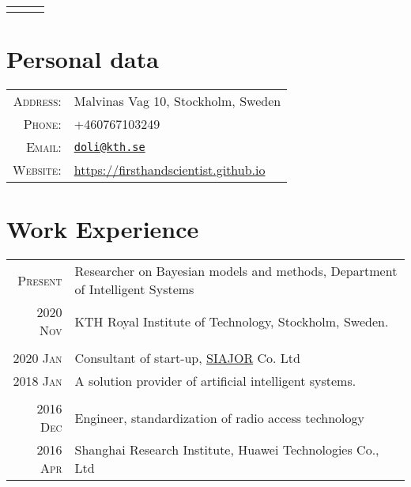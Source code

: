 \documentclass[a4paper,10pt]{article}
\begin{document}
\pagestyle{empty}


\begin{center}
  \begin{tabular}{lcr}
    \par{\centering{\Huge Dong Liu}\bigskip\par} & & %
  \end{tabular}
\end{center}

\section{Personal data}

\begin{tabular}{rl}
  \textsc{Address:} & Malvinas Vag 10, Stockholm, Sweden \\
  \textsc{Phone:} & +460767103249 \\
  \textsc{Email:} & \href{mailto:doli@kth.se}{\nolinkurl{doli@kth.se}} \\
  \textsc{Website:} & \href{https://firsthandscientist.github.io}{https://firsthandscientist.github.io}\\
\end{tabular}


\section{Work Experience}
\begin{tabular}{r|p{13cm}}
  \textsc{Present}  & Researcher on Bayesian models and methods, Department of Intelligent Systems \\
  \textsc{2020 Nov}  & KTH Royal Institute of Technology, Stockholm, Sweden.\\
  \multicolumn{2}{c}{} \\

  \textsc{2020 Jan}  & Consultant of start-up, \href{http://www.siajor.com/}{SIAJOR} Co. Ltd \\
  \textsc{2018 Jan}  & A solution provider of artificial intelligent systems. \\
  \multicolumn{2}{c}{} \\

  \textsc{2016 Dec}  & Engineer, standardization of radio access technology  \\
  \textsc{2016 Apr}  & Shanghai Research Institute, Huawei Technologies Co., Ltd \\
\end{tabular}
\end{document}
